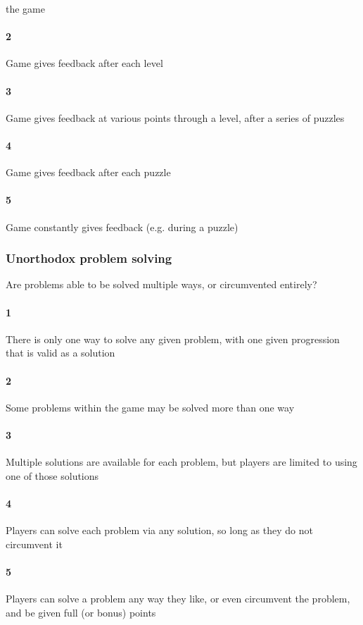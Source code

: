 the game\paragraph{2}Game gives feedback after each level\paragraph{3}Game gives feedback at various points through a level, after a series of puzzles\paragraph{4}Game gives feedback after each puzzle\paragraph{5}Game constantly gives feedback (e.g. during a puzzle)\subsubsection{Unorthodox problem solving}Are problems able to be solved multiple ways, or circumvented entirely?\paragraph{1}There is only one way to solve any given problem, with one given progression that is valid as a solution\paragraph{2}Some problems within the game may be solved more than one way\paragraph{3}Multiple solutions are available for each problem, but players are limited to using one of those solutions\paragraph{4}Players can solve each problem via any solution, so long as they do not circumvent it\paragraph{5}Players can solve a problem any way they like, or even circumvent the problem, and be given full (or bonus) points